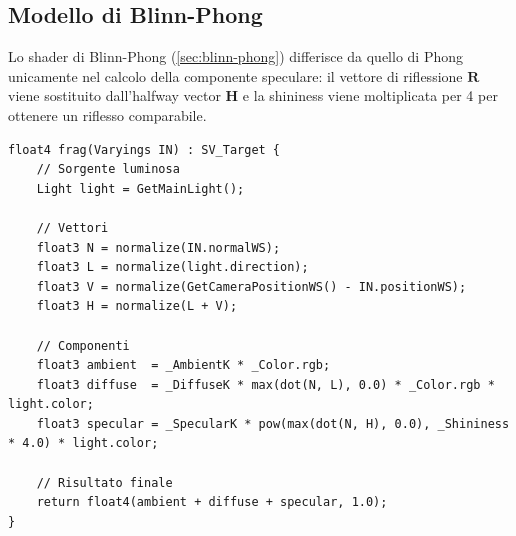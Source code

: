\documentclass[12pt,a4paper,twoside]{book}
\begin{document}
\begin{minipage}{\textwidth}

\subsection{Modello di Blinn-Phong}
\label{subsec:impl-blinn}

Lo shader di Blinn-Phong (\cref{sec:blinn-phong}) differisce da quello di Phong unicamente nel calcolo della componente speculare: il vettore di riflessione $\mathbf{R}$ viene sostituito dall'halfway vector $\mathbf{H}$ e la shininess viene moltiplicata per 4 per ottenere un riflesso comparabile.

\begin{lstlisting}[style=hlsl,
    caption={Fragment shader del modello di Blinn-Phong.},
    label={lst:frag-blinn}]
float4 frag(Varyings IN) : SV_Target {
    // Sorgente luminosa
    Light light = GetMainLight();
    
    // Vettori
    float3 N = normalize(IN.normalWS);
    float3 L = normalize(light.direction);
    float3 V = normalize(GetCameraPositionWS() - IN.positionWS);
    float3 H = normalize(L + V);
    
    // Componenti
    float3 ambient  = _AmbientK * _Color.rgb;
    float3 diffuse  = _DiffuseK * max(dot(N, L), 0.0) * _Color.rgb * light.color;
    float3 specular = _SpecularK * pow(max(dot(N, H), 0.0), _Shininess * 4.0) * light.color;
    
    // Risultato finale
    return float4(ambient + diffuse + specular, 1.0);
}
\end{lstlisting}

\end{minipage}
\end{document}
